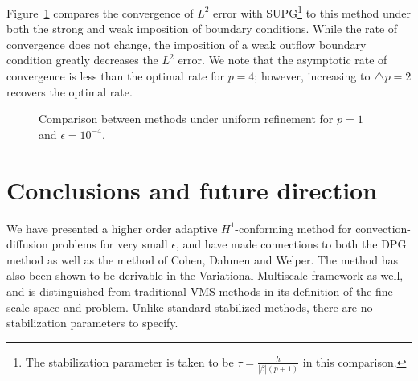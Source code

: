 \documentclass[final,leqno]{siamltex}
\newcommand{\LRb}[1]{\left| #1 \right|}
\begin{document}
Figure~\ref{fig:supg_comparison} compares the convergence of $L^2$ error with SUPG\footnote{The stabilization parameter is taken to be $\tau = \frac{h}{\LRb{\beta}(p+1)}$ in this comparison.} to this method under both the strong and weak imposition of boundary conditions.  While the rate of convergence does not change, the imposition of a weak outflow boundary condition greatly decreases the $L^2$ error.  We note that the asymptotic rate of convergence is less than the optimal rate for $p=4$; however, increasing to $\triangle p = 2$ recovers the optimal rate.  
\begin{figure}
\centering
{}
\caption{Comparison between methods under uniform refinement for $p=1$ and $\epsilon=10^{-4}$.}
\label{fig:supg_comparison}
\end{figure}	

\section{Conclusions and future direction}

We have presented a higher order adaptive $H^1$-conforming method for convection-diffusion problems for very small $\epsilon$, and have made connections to both the DPG method as well as the method of Cohen, Dahmen and Welper.  The method has also been shown to be derivable in the Variational Multiscale framework as well, and is distinguished from traditional VMS methods in its definition of the fine-scale space and problem.  Unlike standard stabilized methods, there are no stabilization parameters to specify.  %
\end{document}
